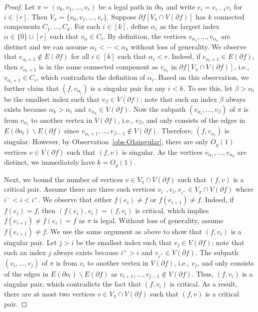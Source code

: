 \documentclass[a4paper,11pt]{article}
\numberwithin{lemma}{section}
\begin{document}
\begin{proof}
Let $\pi = (v_0,v_1,\dots,v_r)$ be a legal path in $\partial o_t$ and write $e_i = v_{i-1}v_i$ for $i \in [r]$.
Then $V_\pi = \{v_0,v_1,\dots,v_r\}$.
Suppose $\partial f [V_\pi \cap V(\partial f)]$ has $k$ connected components $C_1,\dots,C_k$.
For each $i \in [k]$, define $\alpha_i$ as the largest index $\alpha \in \{0\} \cup [r]$ such that $v_\alpha \in C_i$.
By definition, the vertices $v_{\alpha_1},\dots,v_{\alpha_k}$ are distinct and we can assume $\alpha_1 < \cdots < \alpha_k$ without loss of generality.
We observe that $e_{\alpha_i+1} \notin E(\partial f)$ for all $i \in [k]$ such that $\alpha_i < r$.
Indeed, if $e_{\alpha_i+1} \in E(\partial f)$, then $v_{\alpha_i+1}$ is in the same connected component as $v_{\alpha_i}$ in $\partial f [V_\pi \cap V(\partial f)]$, i.e., $v_{\alpha_i+1} \in C_i$, which contradicts the definition of $\alpha_i$.
Based on this observation, we further claim that $(f,v_{\alpha_i})$ is a singular pair for any $i<k$.
To see this, let $\beta > \alpha_i$ be the smallest index such that $v_\beta \in V(\partial f)$; note that such an index $\beta$ always exists because $\alpha_k > \alpha_i$ and $v_{\alpha_k} \in V(\partial f)$.
Now the subpath $(v_{\alpha_i},\dots,v_\beta)$ of $\pi$ is from $v_{\alpha_i}$ to another vertex in $V(\partial f)$, i.e., $v_\beta$, and only consists of the edges in $E(\partial o_t) \backslash E(\partial f)$ since $v_{\alpha_i+1},\dots,v_{\beta-1} \notin V(\partial f)$.
Therefore, $(f,v_{\alpha_i})$ is singular.
However, by Observation~\ref{obs-O1singular}, there are only $O_g(1)$ vertices $v \in V(\partial f)$ such that $(f,v)$ is singular.
As the vertices $v_{\alpha_1},\dots,v_{\alpha_k}$ are distinct, we immediately have $k = O_g(1)$.

Next, we bound the number of vertices $v \in V_\pi \cap V(\partial f)$ such that $(f,v)$ is a critical pair.
Assume there are three such vertices $v_{i^-},v_i,v_{i^+} \in V_\pi \cap V(\partial f)$ where $i^- < i < i^+$.
We observe that either $f(e_i) \neq f$ or $f(e_{i+1}) \neq f$.
Indeed, if $f(e_i) = f$, then $(f(e_i),v_i) = (f,v_i)$ is critical, which implies $f(e_{i+1}) \neq f(e_i) = f$ as $\pi$ is legal.
Without loss of generality, assume $f(e_{i+1}) \neq f$.
We use the same argument as above to show that $(f,v_i)$ is a singular pair.
Let $j > i$ be the smallest index such that $v_j \in V(\partial f)$; note that such an index $j$ always exists because $i^+ > i$ and $v_{i^+} \in V(\partial f)$.
The subpath $(v_i,\dots,v_j)$ of $\pi$ is from $v_i$ to another vertex in $V(\partial f)$, i.e., $v_j$, and only consists of the edges in $E(\partial o_t) \backslash E(\partial f)$ as $v_{i+1},\dots,v_{j-1} \notin V(\partial f)$.
Thus, $(f,v_i)$ is a singular pair, which contradicts the fact that $(f,v_i)$ is critical.
As a result, there are at most two vertices $v \in V_\pi \cap V(\partial f)$ such that $(f,v)$ is a critical pair.
\end{proof}
\end{document}
